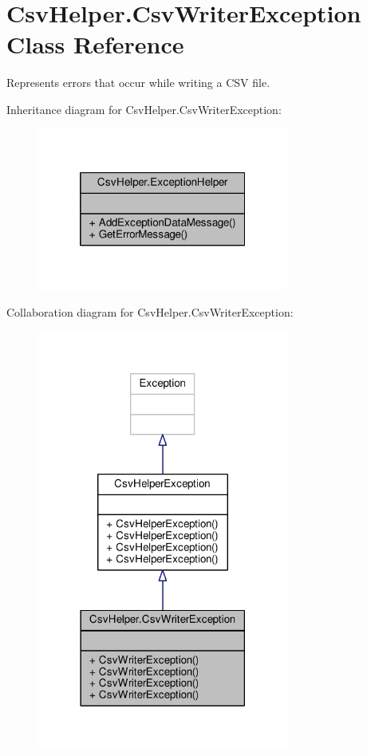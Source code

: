 \hypertarget{a00062}{\section{Csv\-Helper.\-Csv\-Writer\-Exception Class Reference}
\label{a00062}
}


Represents errors that occur while writing a C\-S\-V file.  




Inheritance diagram for Csv\-Helper.\-Csv\-Writer\-Exception\-:
\nopagebreak
\begin{figure}[H]
\begin{center}
\leavevmode
\includegraphics[width=234pt]{d4/d13/a00377}
\end{center}
\end{figure}


Collaboration diagram for Csv\-Helper.\-Csv\-Writer\-Exception\-:
\nopagebreak
\begin{figure}[H]
\begin{center}
\leavevmode
\includegraphics[width=234pt]{d7/d08/a00378}
\end{center}
\end{figure}
